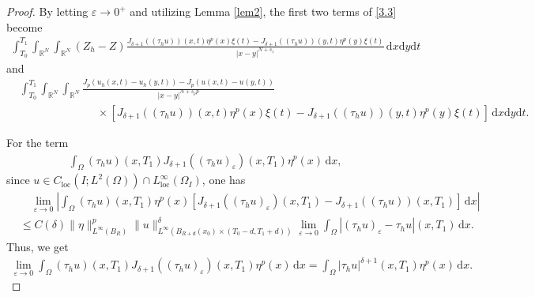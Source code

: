 \documentclass[reqno,10pt]{amsart}
\numberwithin{equation}{section}
\begin{document}
\begin{proof}
	By letting $\varepsilon\rightarrow0^+$ and utilizing Lemma \ref{lem2}, the first two terms of \eqref{3.3} become
	\begin{align}
		\label{3.31}
		\int_{T_0}^{T_1}\int_{\mathbb{R}^N}\int_{\mathbb{R}^N}(Z_h-Z)\frac{J_{\delta+1}\left((\tau_hu)\right)(x,t)\eta^p(x)\xi(t)-J_{\delta+1}\left((\tau_hu)\right)(y,t)\eta^p(y)\xi(t)}{|x-y|^{N+s_1}}\,\mathrm{d}x\mathrm{d}y\mathrm{d}t
	\end{align}
	and
	\begin{align}
		\label{3.32}
		&\int_{T_0}^{T_1}\int_{\mathbb{R}^N}\int_{\mathbb{R}^N}\frac{J_p\left(u_h(x,t)-u_h(y,t)\right)-J_p\left(u(x,t)-u(y,t)\right)}{|x-y|^{N+s_pp}}\nonumber\\
		&\qquad\qquad\qquad\quad\times\left[J_{\delta+1}\left((\tau_hu)\right)(x,t)\eta^p(x)\xi(t)-J_{\delta+1}\left((\tau_hu)\right)(y,t)\eta^p(y)\xi(t)\right]\,\mathrm{d}x\mathrm{d}y\mathrm{d}t.
	\end{align}
	
	For the term
	\begin{align*}
		\int_{\Omega}\left(\tau_hu\right)(x,T_1)J_{\delta+1}\left((\tau_hu)_{\varepsilon}\right)(x,T_1)\eta^p(x)\,\mathrm{d}x,
	\end{align*}
	since $u\in C_{\mathrm{loc}}\left(I;L^2(\Omega)\right)\cap L_\mathrm{loc}^\infty\left(\Omega_I\right)$, one has
	\begin{align*}
		&\quad\lim\limits_{\varepsilon\rightarrow0}\left| \int_{\Omega}(\tau_hu)(x,T_1)\eta^p(x)\left[J_{\delta+1}\left((\tau_hu)_{\varepsilon}\right)(x,T_1)-J_{\delta+1}\left((\tau_hu)\right)(x,T_1)\right]\,\mathrm{d}x\right|\\
		&\le C(\delta)\|\eta\|^p_{L^\infty(B_R)}\|u\|^\delta_{L^\infty\left(B_{R+d}(x_0)\times(T_0-d,T_1+d)\right)}\lim\limits_{\varepsilon\rightarrow0}\int_{\Omega}\left|(\tau_hu)_\varepsilon-\tau_hu\right|(x,T_1)\,\mathrm{d}x.
	\end{align*}
	Thus, we get
	\begin{align}
		\label{3.4}
		\lim\limits_{\varepsilon\rightarrow0}\int_{\Omega}(\tau_hu)(x,T_1)J_{\delta+1}\left((\tau_hu)_{\varepsilon}\right)(x,T_1)\eta^p(x)\,\mathrm{d}x=\int_{\Omega}\left|\tau_hu\right|^{\delta+1}(x,T_1)\eta^p(x)\,\mathrm{d}x.
	\end{align}
	

\end{proof}
\end{document}
